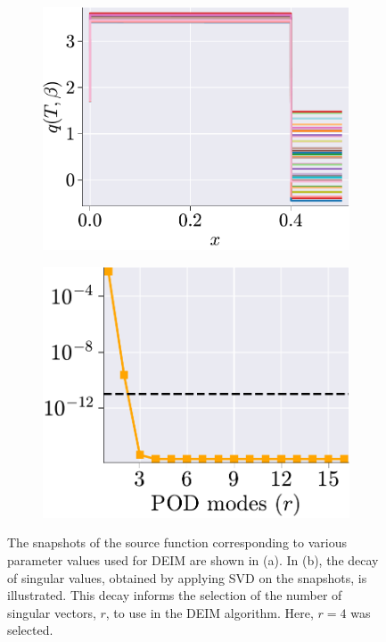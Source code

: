 \documentclass[11pt]{article}
\begin{document}
\begin{figure}[t]
\centering
\begin{subfigure}[b]{0.45\linewidth}
\centering
\includegraphics[width=\linewidth]{DEIM_snapshots.pdf}
\caption{}
\label{fig:DEIM_snap_a}
\end{subfigure}
\begin{subfigure}[b]{0.45\linewidth}
\centering
\includegraphics[width=0.97\linewidth]{DEIM_SVs.pdf}
\caption{}
\label{fig:DEIM_snap_b}
\end{subfigure}
\caption{The snapshots of the source function corresponding to various parameter values used for DEIM are shown in (a).
In (b), the decay of singular values, obtained by applying SVD on the snapshots, is illustrated.
This decay informs the selection of the number of singular vectors, \( r \), to use in the DEIM algorithm.
Here, \( r = 4 \) was selected.}
\label{fig:DEIM_snap}
\end{figure}
\end{document}

